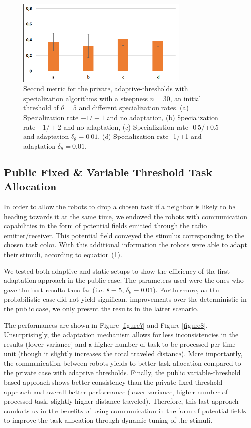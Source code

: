 	\begin{figure}[thpb]
      \centering
      \includegraphics[width=8.5cm]{Pictures/PrivSpecMetric2.png}
      \caption{Second metric for the private, adaptive-thresholds with specialization algorithms with a steepness $n=30$, an initial threshold of $\theta=5$ and different specialization rates. (a) Specialization rate $-1/+1$ and no adaptation, (b) Specialization rate $-1/+2$ and no adaptation, (c) Specialization rate -0.5/+0.5 and adaptation $\delta_{\theta}=0.01$, (d) Specialization rate -1/+1 and adaptation $\delta_{\theta}=0.01$.}
      \label{figure6}
   \end{figure}

\subsection{Public Fixed \& Variable Threshold Task Allocation}
In order to allow the robots to drop a chosen task if a neighbor is likely to be heading towards it at the same time, we endowed the robots with communication capabilities in the form of potential fields emitted through the radio emitter/receiver. This potential field conveyed the stimulus corresponding to the chosen task color. With this additional information the robots were able to adapt their stimuli, according to equation (1).

We tested both adaptive and static setups to show the efficiency of the first adaptation approach in the public case. The parameters used were the ones who gave the best results thus far (i.e. $\theta = 5$, $\delta_{\theta} = 0.01$). Furthermore, as the probabilistic case did not yield significant improvements over the deterministic in the public case, we only present the results in the latter scenario.

The performances are shown in Figure \ref{figure7} and Figure \ref{figure8}. Unsurprisingly, the adaptation mechanism allows for less inconsistencies in the results (lower variance) and a higher number of task to be processed per time unit (though it slightly increases the total traveled distance). More importantly, the communication between robots yields to better task allocation compared to the private case with adaptive thresholds. Finally, the public variable-threshold based approach shows better consistency than the private fixed threshold approach and overall better performance (lower variance, higher number of processed task, slightly higher distance traveled). Therefore, this last approach comforts us in the benefits of using communication in the form of potential fields to improve the task allocation through dynamic tuning of the stimuli.


